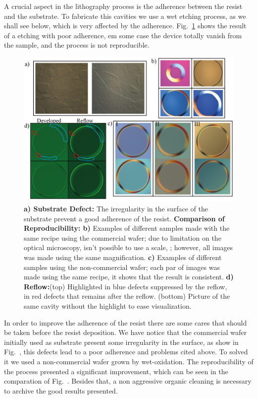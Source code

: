 A crucial aspect in the lithography process is the adherence between the resist and the substrate. To fabricate this cavities we use a wet etching process, as we shall see below, which is very affected by the adherence. Fig.~\ref{fig:adhrence_problem} 
shows the result of a etching with poor adherence, em some case the device totally vanish from the sample, and the process is not reproducible.
\begin{figure}[!hbt]
    \centering
    \includegraphics[width = 16cm]{figuras/Dissertation_etching_result.jpg}
    \caption{\textbf{a) Substrate Defect:} The irregularity in the surface of the substrate prevent a good adherence of the resist. \textbf{Comparison of Reproducibility: b)} Examples of different samples made with the same recipe using the commercial wafer; due to limitation on the optical microscopy, isn't possible to use a scale, ; however, all images was made using the same magnification. \textbf{c)} Examples of different samples using the non-commercial wafer; each par of images was made using the same recipe, it shows that the result is consistent. \textbf{d) Reflow:}(top) Highlighted in blue defects suppressed by the reflow, in red defects that remains after the reflow. (bottom) Picture of the same cavity without the highlight to ease visualization.}
    \label{fig:adhrence_problem}
\end{figure}

In order to improve the adherence of the resist there are some cares that should be taken before the resist deposition. We have notice that the commercial wafer initially used as substrate present some irregularity in the surface, as show in Fig.~, this defects lead to a poor adherence and problems cited above. To solved it we used a non-commercial wafer grown by wet-oxidation. The reproducibility of the process presented a significant improvement, which can be seen in the comparation of Fig.~. Besides that, a non aggressive organic cleaning is necessary to archive the good results presented.

